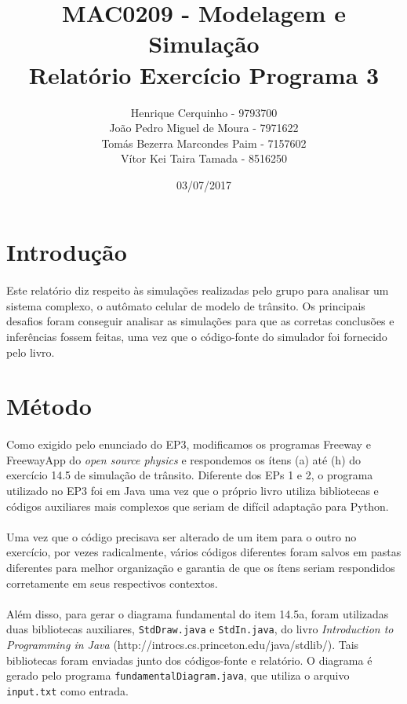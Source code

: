 \documentclass{article}
\title{MAC0209 - Modelagem e Simulação \\
Relatório Exercício Programa 3}
\author{Henrique Cerquinho - 9793700 \\
João Pedro Miguel de Moura - 7971622 \\
Tomás Bezerra Marcondes Paim - 7157602 \\
Vítor Kei Taira Tamada - 8516250}
\date{03/07/2017}
\begin{document}
\maketitle

\section{Introdução}
\paragraph{}Este relatório diz respeito às simulações realizadas pelo grupo para analisar um sistema complexo, o autômato celular de modelo de trânsito. Os principais desafios foram conseguir analisar as simulações para que as corretas conclusões e inferências fossem feitas, uma vez que o código-fonte do simulador foi fornecido pelo livro.

\section{Método}
\paragraph{}Como exigido pelo enunciado do EP3, modificamos os programas Freeway e FreewayApp do \textit{open source physics} e respondemos os ítens (a) até (h) do exercício 14.5 de simulação de trânsito. Diferente dos EPs 1 e 2, o programa utilizado no EP3 foi em Java uma vez que o próprio livro utiliza bibliotecas e códigos auxiliares mais complexos que seriam de difícil adaptação para Python.

\paragraph{}Uma vez que o código precisava ser alterado de um item para o outro no exercício, por vezes radicalmente, vários códigos diferentes foram salvos em pastas diferentes para melhor organização e garantia de que os ítens seriam respondidos corretamente em seus respectivos contextos.

\paragraph{}Além disso, para gerar o diagrama fundamental do item 14.5a, foram utilizadas duas bibliotecas auxiliares, \texttt{StdDraw.java} e \texttt{StdIn.java}, do livro \textit{Introduction to Programming in Java} (http://introcs.cs.princeton.edu/java/stdlib/). Tais bibliotecas foram enviadas junto dos códigos-fonte e relatório. O diagrama é gerado pelo programa \texttt{fundamentalDiagram.java}, que utiliza o arquivo \texttt{input.txt} como entrada.
\end{document}
